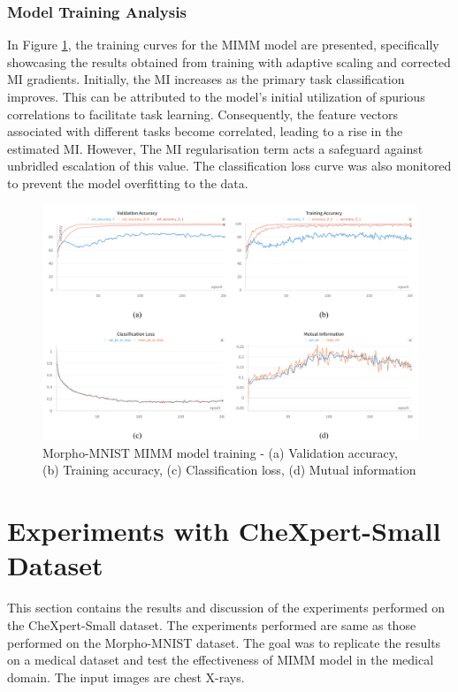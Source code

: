 \documentclass[12pt,DIV14,BCOR12mm,a4paper,footinclude=false,headinclude,parskip=half-,twoside,openright,cleardoublepage=empty,toc=index,bibliography=totoc,listof=totoc]{scrreprt}
\numberwithin{equation}{chapter}
\begin{document}
\subsubsection{Model Training Analysis}
In Figure \ref{fig:train-curve-mnist}, the training curves for the MIMM model are presented, specifically showcasing the results obtained from training with adaptive scaling and corrected MI gradients. Initially, the MI increases as the primary task classification improves. This can be attributed to the model's initial utilization of spurious correlations to facilitate task learning. Consequently, the feature vectors associated with different tasks become correlated, leading to a rise in the estimated MI. However, The MI regularisation term acts a safeguard against unbridled escalation of this value. The classification loss curve was also monitored to prevent the model overfitting to the data. 
\begin{figure}[H]
\centering
\includegraphics[width=1\linewidth]{thesis/figures/train_mnist_curve.pdf}
\caption{Morpho-MNIST MIMM model training - (a) Validation accuracy, (b) Training accuracy, (c) Classification loss, (d) Mutual information}
\label{fig:train-curve-mnist}
\end{figure}

\section{Experiments with CheXpert-Small Dataset}
This section contains the results and discussion of the experiments performed on the CheXpert-Small dataset. The experiments performed are same as those performed on the Morpho-MNIST dataset. The goal was to replicate the results on a medical dataset and test the effectiveness of MIMM model in the medical domain. The input images are chest X-rays.
\end{document}
